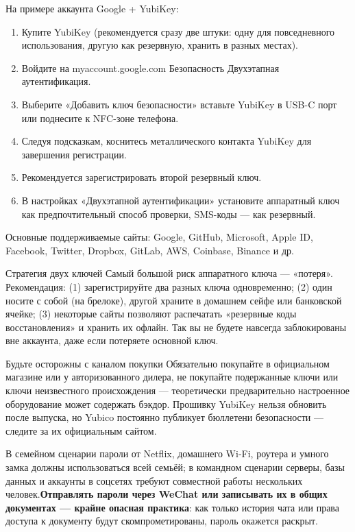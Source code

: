 На примере аккаунта Google + YubiKey:

\begin{enumerate}
  \item Купите YubiKey (рекомендуется сразу две штуки: одну для повседневного использования, другую как резервную, хранить в разных местах).
  \item Войдите на myaccount.google.com Безопасность Двухэтапная аутентификация.
  \item Выберите «Добавить ключ безопасности» вставьте YubiKey в USB-C порт или поднесите к NFC-зоне телефона.
  \item Следуя подсказкам, коснитесь металлического контакта YubiKey для завершения регистрации.
  \item Рекомендуется зарегистрировать второй резервный ключ.
  \item В настройках «Двухэтапной аутентификации» установите аппаратный ключ как предпочтительный способ проверки, SMS-коды — как резервный.
\end{enumerate}

Основные поддерживаемые сайты: Google, GitHub, Microsoft, Apple ID, Facebook, Twitter, Dropbox, GitLab, AWS, Coinbase, Binance и др.

\begin{tcbinfo}{Стратегия двух ключей}
Самый большой риск аппаратного ключа — «потеря». Рекомендация: (1) зарегистрируйте два разных ключа одновременно; (2) один носите с собой (на брелоке), другой храните в домашнем сейфе или банковской ячейке; (3) некоторые сайты позволяют распечатать «резервные коды восстановления» и хранить их офлайн. Так вы не будете навсегда заблокированы вне аккаунта, даже если потеряете основной ключ.

\end{tcbinfo}

\begin{tcbwarn}{Будьте осторожны с каналом покупки}
Обязательно покупайте в официальном магазине или у авторизованного дилера, не покупайте подержанные ключи или ключи неизвестного происхождения — теоретически предварительно настроенное оборудование может содержать бэкдор. Прошивку YubiKey нельзя обновить после выпуска, но Yubico постоянно публикует бюллетени безопасности — следите за их официальным сайтом.

\end{tcbwarn}


В семейном сценарии пароли от Netflix, домашнего Wi-Fi, роутера и умного замка должны использоваться всей семьёй; в командном сценарии серверы, базы данных и аккаунты в соцсетях требуют совместной работы нескольких человек.\textbf{Отправлять пароли через WeChat или записывать их в общих документах — крайне опасная практика}: как только история чата или права доступа к документу будут скомпрометированы, пароль окажется раскрыт.

